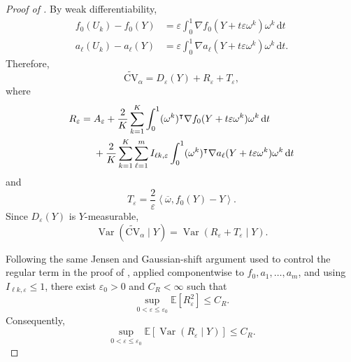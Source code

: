 \documentclass[12pt]{article}
\newcommand{\tran}{^\intercal}
\newcommand{\rd}{{\mathrm{d}}}
\theoremstyle{general}
\newcommand{\cv}{{\mathrm{CV}}}
\begin{document}
\begin{proof}[Proof of ]
By weak differentiability,
\begin{align*}
f_0(U_k)-f_0(Y)
&=
\varepsilon
\int_0^1
\nabla f_0(Y+t\varepsilon\omega^k)\omega^k
\,\rd t
\\
a_\ell(U_k)-a_\ell(Y)
&=
\varepsilon
\int_0^1
\nabla a_\ell(Y+t\varepsilon\omega^k)\omega^k
\,\rd t.
\end{align*}
Therefore,
\begin{equation}
\label{eq:control-variate-decomposition}
\widetilde{\cv}_{\alpha}
=
D_\varepsilon(Y)+R_\varepsilon+T_\varepsilon,
\end{equation}
where
\begin{align*}
R_\varepsilon
={}&
A_\varepsilon
+
\frac2K\sum_{k=1}^K
\int_0^1
(\omega^k)\tran
\nabla f_0(Y+t\varepsilon\omega^k)
\omega^k
\,\rd t
\notag\\
&+
\frac2K
\sum_{k=1}^K\sum_{\ell=1}^m
I_{\ell k,\varepsilon}
\int_0^1
(\omega^k)\tran
\nabla a_\ell(Y+t\varepsilon\omega^k)
\omega^k
\,\rd t
\end{align*}
and
\begin{equation*}
T_\varepsilon
=
\frac{2}{\varepsilon}
\left\langle
\overline\omega,
f_0(Y)-Y
\right\rangle.
\end{equation*}
Since \(D_\varepsilon(Y)\) is \(Y\)-measurable,
\begin{equation*}
\operatorname{Var}
\left(
\widetilde{\cv}_{\alpha}\mid Y
\right)
=
\operatorname{Var}
\left(
R_\varepsilon+T_\varepsilon\mid Y
\right).
\end{equation*}

Following the same Jensen and Gaussian-shift argument used to control
the regular term in the proof of , applied
componentwise to \(f_0,a_1,\ldots,a_m\), and using
\(I_{\ell k,\varepsilon}\leq 1\), there exist
\(\varepsilon_0>0\) and \(C_R<\infty\) such that
\begin{equation}
\label{eq:control-variate-regular-bound}
\sup_{0<\varepsilon\leq\varepsilon_0}
\mathbb E[R_\varepsilon^2]
\leq C_R.
\end{equation}
Consequently,
\[
\sup_{0<\varepsilon\leq\varepsilon_0}
\mathbb E\!\left[
\operatorname{Var}(R_\varepsilon\mid Y)
\right]
\leq C_R.
\]


\end{proof}
\end{document}
